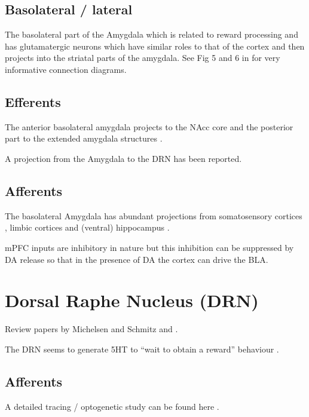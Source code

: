 \documentclass[12pt,a4paper]{article}
\begin{document}
\subsection{Basolateral / lateral}

The basolateral part of the Amygdala which is related to reward processing and has glutamatergic neurons which have similar roles to that of the cortex and then projects into the striatal parts of the amygdala. See Fig 5 and 6 in \citep{Swanson1998} for very informative connection diagrams.

\subsection{Efferents}

The anterior basolateral amygdala projects to the NAcc core and the  posterior part to the extended amygdala structures  \citep{Alheid2003}.

A projection from the Amygdala to the DRN \citep{PollakDorocic2014} has been reported.

\subsection{Afferents}

The basolateral Amygdala has abundant projections from somatosensory cortices 
\citep{Swanson1998}, limbic cortices \citep{Ottersen1982} and (ventral) hippocampus \citep{Pitkanen2000}.

mPFC inputs are inhibitory in nature \citep{Rosenkranz2002} but this inhibition can be suppressed by DA release so that in the presence of DA the cortex can drive the BLA.




\section{Dorsal Raphe Nucleus (DRN)}

Review papers by Michelsen and Schmitz \citep{Michelsen2007} and \citep{Nakamura2013}.

The DRN seems to generate 5HT to “wait to obtain a reward” behaviour  \citep{Nakamura2013}.

\subsection{Afferents}

A detailed tracing / optogenetic study can be found here  \citep{PollakDorocic2014}.
\end{document}

